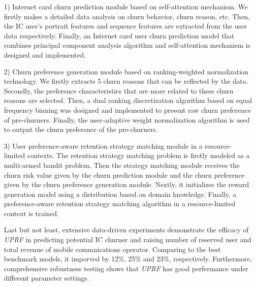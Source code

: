 \begin{abstracten}
	1) Internet card churn prediction module based on self-attention mechanism.
	We firstly makes a detailed data analysis on churn behavior, churn reason, etc. Then, the IC user's portrait features and sequence features are extracted from the user data respectively. Finally, an Internet card user churn prediction model that combines principal component analysis algorithm and self-attention mechanism is designed and implemented.	
	\par
	2) Churn preference generation module based on ranking-weighted normalization technology. We firstly extracts 5 churn reasons that can be reflected by the data. Secondly, the preference characteristics that are more related to these churn reasons are selected. Then, a dual ranking discretization algorithm based on equal frequency binning was designed and implemented to present raw churn preference of pre-churners. Finally, the user-adaptive weight normalization algorithm is used to output the churn preference of the pre-churners.
	\par
	3) User preference-aware retention strategy matching module in a resource-limited contexts.	The retention strategy matching problem is firstly modeled as a multi-armed bandit problem. Then the strategy matching module receives the churn risk value given by the churn prediction module and the churn preference given by the churn preference generation module. Nextly, it initializes the reward generation model using a distribution based on domain knowledge. Finally, a preference-aware retention strategy matching algorithm in a resource-limited context is trained.
	\par
	Last but not least, extensive data-driven experiments demonstrate the efficacy of \emph{UPRF} in predicting potential IC churner and raising number of reserved user and total revenue of mobile commnications operator. Comparing to the best benchmark models, it imporved by 12\%, 25\% and 23\%, respectively. Furthermore, comprehensive robustness testing shows that \emph{UPRF} has good perfermance under different parameter settings.	
	

\end{abstracten}
